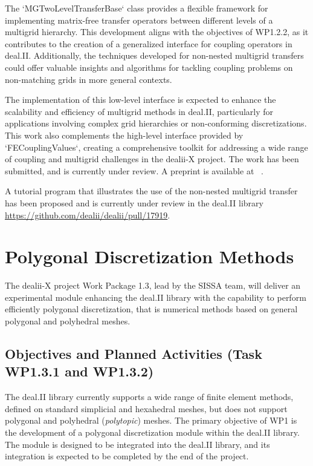 \documentclass[a4paper,12pt]{article}
\begin{document}
    The `MGTwoLevelTransferBase` class provides a flexible framework for
    implementing matrix-free transfer operators between different levels of a
    multigrid hierarchy. This development aligns with the objectives of WP1.2.2,
    as it contributes to the creation of a generalized interface for coupling
    operators in deal.II. Additionally, the techniques developed for non-nested
    multigrid transfers could offer valuable insights and algorithms for
    tackling coupling problems on non-matching grids in more general contexts.

    The implementation of this low-level interface is expected to enhance the
    scalability and efficiency of multigrid methods in deal.II, particularly for
    applications involving complex grid hierarchies or non-conforming
    discretizations. This work also complements the high-level interface
    provided by `FECouplingValues`, creating a comprehensive toolkit for
    addressing a wide range of coupling and multigrid challenges in the dealii-X
    project. The work has been submitted, and is currently under review. A
    preprint is available at ~\cite{FederEtAl2024b}.

   A tutorial program that illustrates the use of the non-nested multigrid
   transfer has been proposed and is currently under review in the deal.II
   library
    \url{https://github.com/dealii/dealii/pull/17919}.


\section{Polygonal Discretization Methods}

 The dealii-X project Work Package 1.3, lead by the SISSA team, will deliver an experimental module enhancing the
deal.II library with the capability to perform efficiently polygonal discretization, that is numerical methods based on general polygonal and polyhedral meshes.%

\subsection{Objectives and Planned Activities (Task WP1.3.1 and WP1.3.2)}

The deal.II library currently
supports a wide range of finite element methods, defined on standard simplicial
and hexahedral meshes, but does not support polygonal and polyhedral (\emph{polytopic}) meshes.
The primary objective of WP1 is the development of a polygonal
discretization module within the deal.II library. The module is designed to be integrated into the deal.II library, and its integration is expected to be completed by the end of the project.
\end{document}
